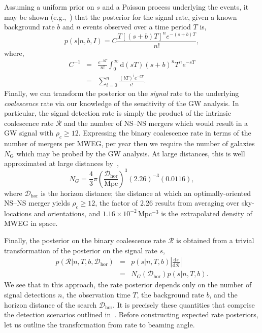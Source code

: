 \documentclass[twocolumn,nofootinbib]{revtex4-1}
\newcommand{\cbcrate}{{{\mathcal R}}}
\newcommand{\diff}{{\mathrm d}}
\newcommand{\dhor}{\ensuremath{{\mathcal D}_{\mathrm{hor}}}}
\newcommand{\mpc}{\mathrm{Mpc}}
\newcommand{\BNS}{\ac{NS}--\ac{NS}\xspace}
\begin{document}
Assuming a uniform prior on $s$ and a Poisson process underlying the
events, it may be shown (e.g.,~\cite{2010blda.book.....G}) that the
posterior for the signal rate, given a known background rate $b$ and
$n$ events observed over a time period $T$ is,
%
\begin{equation}
p(s|n,b,I) = C \frac{ T\left[(s+b)T\right]^n e^{-(s+b)T}}{n!},
\end{equation}
%
where,
\begin{eqnarray}
C^{-1} & = &\frac{e^{-bT}}{n!} \int_0^{\infty}\diff(sT)(s+b)^n T^n e^{-sT}\\
& = & \sum_{i=0}^n \frac{ (bT)^i e^{-bT}}{i!}.
\end{eqnarray}
%
Finally, we can transform the posterior on the \emph{signal} rate to
the underlying \emph{coalescence} rate via our knowledge of the
sensitivity of the \ac{GW} analysis.  In particular, the signal
detection rate is simply the product of the intrinsic coalescence rate
$\cbcrate$ and the number of \BNS mergers which would result in a
\ac{GW} signal with $\rho_c\geq12$.  Expressing the binary coalescence
rate in terms of the number of mergers per \ac{MWEG}, per year then we
require the number of galaxies $N_{\mathrm{G}}$ which may be probed by
the \ac{GW} analysis.  At large distances, this is well approximated
at large distances by~\cite{rates_paper},
%
\begin{equation}
    N_G = \frac{4}{3} \pi \left( \frac{\dhor}{\mpc}
\right)^3 (2.26)^{-3} (0.0116),
\end{equation}
%
where $\dhor$ is the horizon distance; the distance at which an
optimally-oriented \BNS merger yields $\rho_c\geq12$, the factor of
2.26 results from averaging over sky-locations and orientations, and
$1.16\times 10^{-2}$\,Mpc$^{-3}$ is the extrapolated density of
\ac{MWEG} in space.

Finally, the posterior on the binary coalescence rate $\cbcrate$ is obtained from a trivial transformation of the posterior on the signal rate $s$,
%
\begin{eqnarray}
    p(\cbcrate|n,T,b,\dhor) & = & p(s|n,T,b) \left|\frac{\diff s}{\diff \cbcrate}\right| \\
                                   & = & N_G(\dhor)p(s|n,T,b).
\end{eqnarray}
%
We see that in this approach, the rate posterior depends only on the
number of signal detections $n$, the observation time $T$, the
background rate $b$, and the horizon distance of the search $\dhor$.
It is precisely these quantities that comprise the detection scenarios
outlined in~\cite{Aasi:2013wya}.  Before constructing expected rate
posteriors, let us outline the transformation from rate to beaming
angle.
\end{document}
